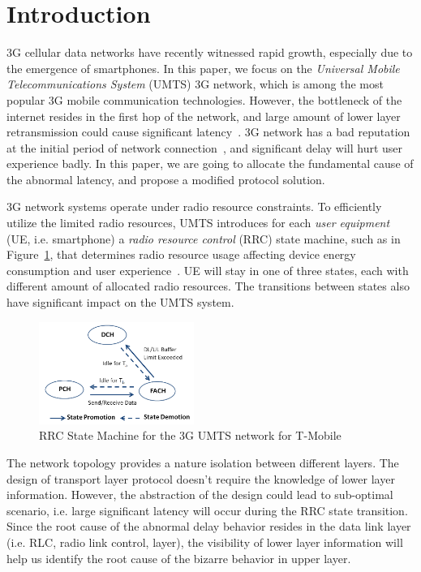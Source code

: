 \section{Introduction}


3G cellular data networks have recently witnessed rapid growth, especially due to the emergence of smartphones. In this paper, we focus on the\textit{ Universal Mobile Telecommunications System} (UMTS) 3G network, which is among the most popular 3G mobile communication technologies. However, the bottleneck of the internet resides in the first hop of the network, and large amount of lower layer retransmission could cause significant latency~\cite{bufferbloat}. 3G network has a bad reputation at the initial period of network connection~\cite{3g.slow}, and significant delay will hurt user experience badly. In this paper, we are going to allocate the fundamental cause of the abnormal latency, and propose a modified protocol solution.

3G network systems operate under radio resource constraints. To efficiently utilize the limited radio resources, UMTS introduces for each \textit{user equipment} (UE, i.e. smartphone) a \textit{radio resource control} (RRC) state machine, such as in Figure~\ref{fig:rrc.state.machine}, that determines radio resource usage affecting device energy consumption and user experience~\cite{spec-3G-RRC}. UE will stay in one of three states, each with different amount of allocated radio resources. The transitions between states also have significant impact on the UMTS system.

\begin{figure}
\centering
\includegraphics[width=0.45\textwidth]{figs/rrc_state.png}
\caption{RRC State Machine for the 3G UMTS network for T-Mobile}
\label{fig:rrc.state.machine}
\end{figure}

The network topology provides a nature isolation between different layers. The design of transport layer protocol doesn't require the knowledge of lower layer information. However, the abstraction of the design could lead to sub-optimal scenario, i.e. large significant latency will occur during the RRC state transition. Since the root cause of the abnormal delay behavior resides in the data link layer (i.e. RLC, radio link control, layer), the visibility of lower layer information will help us identify the root cause of the bizarre behavior in upper layer. 

